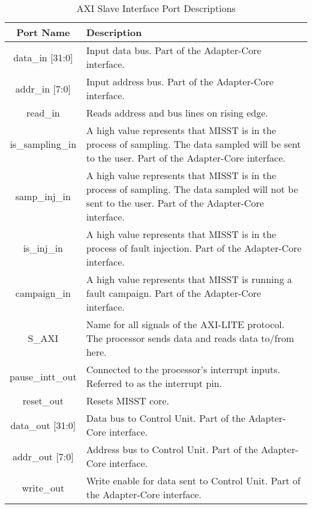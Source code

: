 \documentclass[]{report}
\begin{document}
\begin{table}[h]
	\centering
	\caption{AXI Slave Interface Port Descriptions}
	\begin{tabular}{|c|p{}|}
		\hline 
		Port Name & Description \\ 
		\hline
		data\_in [31:0] & Input data bus. Part of the Adapter-Core interface.\\
		\hline
		addr\_in [7:0] & Input address bus. Part of the Adapter-Core interface.\\
		\hline
		read\_in & Reads address and bus lines on rising edge.\\
		\hline
		is\_sampling\_in & A high value represents that MISST is in the process of sampling. The data sampled will be sent to the user. Part of the Adapter-Core interface.\\
		\hline
		samp\_inj\_in & A high value represents that MISST is in the process of sampling. The data sampled will not be sent to the user. Part of the Adapter-Core interface.\\  
		\hline
		is\_inj\_in & A high value represents that MISST is in the process of fault injection. Part of the Adapter-Core interface.\\ 
		\hline
		campaign\_in & A high value represents that MISST is running a fault campaign. Part of the Adapter-Core interface.\\
		\hline
		S\_AXI & Name for all signals of the AXI-LITE protocol. The processor sends data and reads data to/from here.\\
		\hline
		pause\_intt\_out & Connected to the processor's interrupt inputs. Referred to as the interrupt pin.\\
		\hline
		reset\_out & Resets MISST core.\\
		\hline
		data\_out [31:0] & Data bus to Control Unit. Part of the Adapter-Core interface.\\ 
		\hline
		addr\_out [7:0] & Address bus to Control Unit. Part of the Adapter-Core interface.\\
		\hline
		write\_out & Write enable for data sent to Control Unit. Part of the Adapter-Core interface.\\
		\hline
	\end{tabular} 
	\label{table:axi slave ports}
\end{table}

\FloatBarrier
\end{document}
